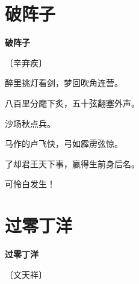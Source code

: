 \documentclass[12pt,UTF-8,openany,fontset=none]{ctexbook}
\begin{document}
\vspace{8pt}
\clearpage

\section{破阵子}


\begin{center}
    {\bfseries 破阵子}

    \vspace{18pt}

    \begin{large}\xuwen
        〔辛弃疾〕
    \end{large}

\end{center}

    \vspace{18pt}  %

\begin{center}
    \begin{Large}

        醉里挑灯看剑，梦回吹角连营。

        八百里分麾下炙，五十弦翻塞外声。

        沙场秋点兵。

        \vspace{18pt}  %

        马作的卢飞快，弓如霹雳弦惊。

        了却君王天下事，赢得生前身后名。

        可怜白发生！

    \end{Large}

\end{center}

\vspace{8pt}
\clearpage

\section{过零丁洋}


\begin{center}
    {\bfseries 过零丁洋}

    \vspace{18pt}

    \begin{large}\xuwen
        〔文天祥〕
    \end{large}

\end{center}
\end{document}
